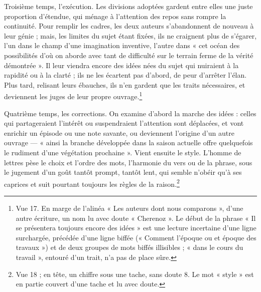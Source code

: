\documentclass[11pt,a4paper]{article}
\begin{document}
Troisième temps, l'exécution. Les divisions adoptées gardent entre elles une
juste proportion d'étendue, qui ménage à l'attention des repos sans rompre la
continuité. Pour remplir les cadres, les deux auteurs s'abandonnent de nouveau
à leur génie ; mais, les limites du sujet étant fixées, ils ne craignent plus
de s'égarer, l'un dans le champ d'une imagination inventive, l'autre dans
« cet océan des possibilités d'où on aborde avec tant de difficulté sur le
terrain ferme de la vérité démontrée ». Il leur viendra encore des idées nées
du sujet qui nuiraient à la rapidité ou à la clarté ; ils ne les écartent pas
d'abord, de peur d'arrêter l'élan. Plus tard, relisant leurs ébauches, ils
n'en gardent que les traits nécessaires, et deviennent les juges de leur propre
ouvrage.\footnote{Vue 17. En marge de l'alinéa « Les auteurs dont nous
comparons », d'une autre écriture, un nom lu avec doute « Cherenoz ». Le début
de la phrase « Il se présentera toujours encore des idées » est une lecture
incertaine d'une ligne surchargée, précédée d'une ligne biffée (« Comment
l'époque ou et époque des travaux ») et de deux groupes de mots biffés
illisibles ; « dans le cours du travail », entouré d'un trait, n'a pas de place
sûre.}

Quatrième temps, les corrections. On examine d'abord la marche des idées :
celles qui partageraient l'intérêt ou suspendraient l'attention sont déplacées,
et vont enrichir un épisode ou une note savante, ou deviennent l'origine d'un
autre ouvrage — « ainsi la branche développée dans la saison actuelle offre
quelquefois le rudiment d'une végétation prochaine ». Vient ensuite le style.
L'homme de lettres pèse le choix et l'ordre des mots, l'harmonie du vers ou de
la phrase, sous le jugement d'un goût tantôt prompt, tantôt lent, qui semble
n'obéir qu'à ses caprices et suit pourtant toujours les règles de la
raison.\footnote{Vue 18 ; en tête, un chiffre sous une tache, sans doute 8. Le
mot « style » est en partie couvert d'une tache et lu avec doute.}
\end{document}
